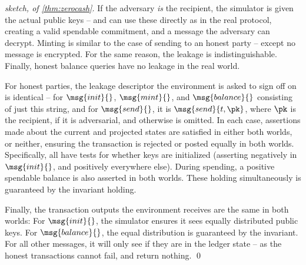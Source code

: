 \begin{proof}[sketch, of \autoref{thm:zerocash}]
  If the adversary \emph{is} the recipient, the simulator is given the actual
  public keys -- and can use these directly as in the real protocol, creating a
  valid spendable commitment, and a message the adversary can decrypt. Minting
  is similar to the case of sending to an honest party -- except no message is
  encrypted. For the same reason, the leakage is indistinguishable. Finally,
  honest balance queries have no leakage in the real world.

  For honest parties, the leakage descriptor the environment is asked to sign
  off on is identical -- for $\msg{init}{}$, $\msg{mint}{}$, and
  $\msg{balance}{}$ consisting of just this string, and for $\msg{send}{}$, it
  is $\msg{send}{t, \pk}$, where $\pk$ is the recipient, if it is adversarial,
  and otherwise is omitted. In each case, assertions made about the current and
  projected states are satisfied in either both worlds, or neither, ensuring the
  transaction is rejected or posted equally in both worlds. Specifically, all
  have tests for whether keys are initialized (asserting negatively in
  $\msg{init}{}$, and positively everywhere else). During spending, a positive
  spendable balance is also asserted in both worlds. These holding
  simultaneously is guaranteed by the invariant holding.

  Finally, the transaction outputs the environment receives are the same in both
  worlds: For $\msg{init}{}$, the simulator ensures it sees equally distributed
  public keys. For $\msg{balance}{}$, the equal distribution is guaranteed by
  the invariant. For all other messages, it will only see if they are in the
  ledger state -- as the honest transactions cannot fail, and return nothing.
  \qed
\end{proof}

